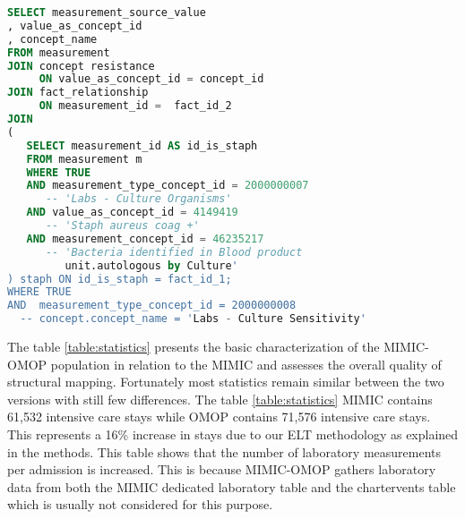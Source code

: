 \begin{lstlisting}[language=sql,basicstyle=\scriptsize,caption=Original table microbiology SQL query,label={lst:original}]
SELECT measurement_source_value
, value_as_concept_id
, concept_name
FROM measurement
JOIN concept resistance 
     ON value_as_concept_id = concept_id
JOIN fact_relationship 
     ON measurement_id =  fact_id_2
JOIN
(
   SELECT measurement_id AS id_is_staph
   FROM measurement m
   WHERE TRUE 
   AND measurement_type_concept_id = 2000000007        			
      -- 'Labs - Culture Organisms'
   AND value_as_concept_id = 4149419                     			
      -- 'Staph aureus coag +' 
   AND measurement_concept_id = 46235217               			
      -- 'Bacteria identified in Blood product 
         unit.autologous by Culture'
) staph ON id_is_staph = fact_id_1;
WHERE TRUE
AND  measurement_type_concept_id = 2000000008        			        
  -- concept.concept_name = 'Labs - Culture Sensitivity'
\end{lstlisting}


The table \ref{table:statistics} presents the basic characterization of the 
MIMIC-OMOP population in relation to the MIMIC and assesses the overall quality of 
structural mapping.
Fortunately most statistics remain similar between the two versions with still
few differences. The table \ref{table:statistics} MIMIC contains 61,532
intensive care stays while OMOP contains 71,576 intensive care stays. This
represents a 16\% increase in stays due to our ELT methodology as explained in
the methods. This table shows that the number of laboratory measurements per
admission is increased. This is because MIMIC-OMOP gathers laboratory data from
both the MIMIC dedicated laboratory table and the chartervents table which is
usually not considered for this purpose.

